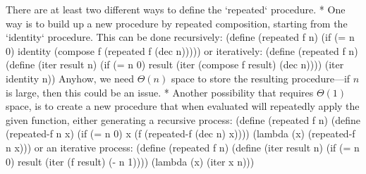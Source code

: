 There are at least two different ways to define the `repeated` procedure.
\begitems
* One way is to build up a new procedure by repeated composition, starting from the `identity` procedure.
This can be done recursively:
\begtt\scm 
(define (repeated f n)
  (if (= n 0)
      identity
      (compose f (repeated f (dec n)))))
\endtt
or iteratively:
\begtt\scm 
(define (repeated f n)
  (define (iter result n)
    (if (= n 0)
        result
        (iter (compose f result) (dec n))))
  (iter identity n))
\endtt
Anyhow, we need $\Theta(n)$ space to store the resulting procedure---if $n$ is large, then this could be an issue.
* Another possibility that requires $\Theta(1)$ space, is to create a new procedure that when evaluated will repeatedly apply the given function, either generating a recursive process:
\begtt\scm
(define (repeated f n)
  (define (repeated-f n x)
    (if (= n 0)
        x
        (f (repeated-f (dec n) x))))
  (lambda (x)
    (repeated-f n x)))
\endtt
or an iterative process:
\begtt\scm
(define (repeated f n)
  (define (iter result n)
    (if (= n 0)
        result
        (iter (f result) (- n 1))))
  (lambda (x)
    (iter x n)))
\endtt
\enditems
